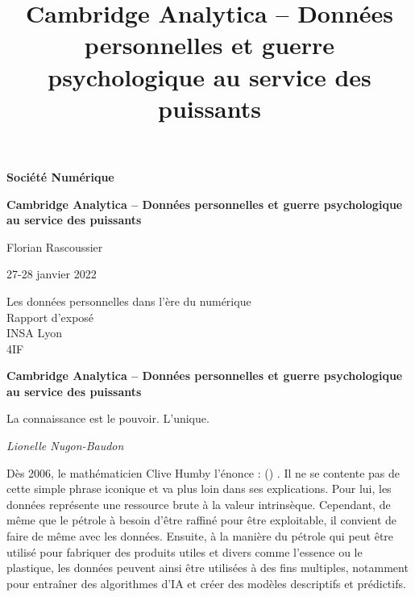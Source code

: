 \documentclass{article}
\title{Cambridge Analytica – Données personnelles et guerre psychologique au service des puissants}
\begin{document}
\begin{titlepage}
    \begin{center}
        \vspace*{1cm}
        \Huge
        \textbf{Société Numérique}
        
        \vspace{2cm}
        
        \Huge
        \textbf{Cambridge Analytica – Données personnelles et guerre psychologique au service des puissants}
            
        \vspace{2cm}
        \Huge
        Florian Rascoussier
        
        \vspace{1.5cm}
        \LARGE
        27-28 janvier 2022
        
        \vfill
        
        \LARGE
        Les données personnelles dans l'ère du numérique\\
        Rapport d'exposé\\
        INSA Lyon\\
        4IF\\
            
    \end{center}
\end{titlepage}


\textbf{{\LARGE Cambridge Analytica – Données personnelles et guerre psychologique au service des puissants}}\\

\epigraph{La connaissance est le pouvoir. L'unique.}{\textit{Lionelle Nugon-Baudon}}

\normalsize
Dès 2006, le mathématicien Clive Humby l’énonce :  () \cite{Haupt2016-nl, Joris_Toonders2014-lb, noauthor_undated-nq}. Il ne se contente pas de cette simple phrase iconique et va plus loin dans ses explications. Pour lui, les données représente une ressource brute à la valeur intrinsèque. Cependant, de même que le pétrole à besoin d’être raffiné pour être exploitable, il convient de faire de même avec les données. Ensuite, à la manière du pétrole qui peut être utilisé pour fabriquer des produits utiles et divers comme l’essence ou le plastique, les données peuvent ainsi être utilisées à des fins multiples, notamment pour entraîner des algorithmes d’IA et créer des modèles descriptifs et prédictifs.\\
\end{document}
